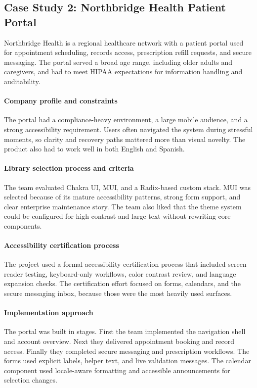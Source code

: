 \subsection{Case Study 2: Northbridge Health Patient Portal}
Northbridge Health is a regional healthcare network with a patient portal used for appointment scheduling, records access, prescription refill requests, and secure messaging. The portal served a broad age range, including older adults and caregivers, and had to meet HIPAA expectations for information handling and auditability.

\paragraph{Company profile and constraints}
The portal had a compliance-heavy environment, a large mobile audience, and a strong accessibility requirement. Users often navigated the system during stressful moments, so clarity and recovery paths mattered more than visual novelty. The product also had to work well in both English and Spanish.

\paragraph{Library selection process and criteria}
The team evaluated Chakra UI, MUI, and a Radix-based custom stack. MUI was selected because of its mature accessibility patterns, strong form support, and clear enterprise maintenance story. The team also liked that the theme system could be configured for high contrast and large text without rewriting core components.

\paragraph{Accessibility certification process}
The project used a formal accessibility certification process that included screen reader testing, keyboard-only workflows, color contrast review, and language expansion checks. The certification effort focused on forms, calendars, and the secure messaging inbox, because those were the most heavily used surfaces.

\paragraph{Implementation approach}
The portal was built in stages. First the team implemented the navigation shell and account overview. Next they delivered appointment booking and record access. Finally they completed secure messaging and prescription workflows. The forms used explicit labels, helper text, and live validation messages. The calendar component used locale-aware formatting and accessible announcements for selection changes.

